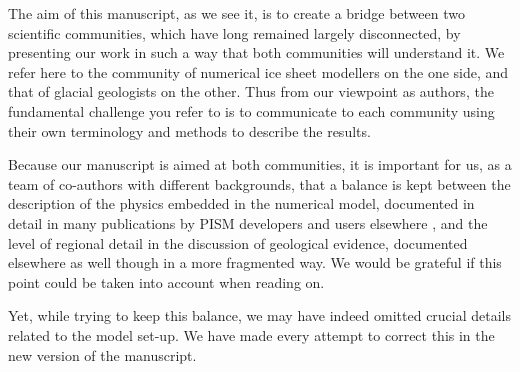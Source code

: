 The aim of this manuscript, as we see it, is to create a bridge between two
scientific communities, which have long remained largely disconnected, by
presenting our work in such a way that both communities will understand it. We
refer here to the community of numerical ice sheet modellers on the one side,
and that of glacial geologists on the other. Thus from our viewpoint as
authors, the fundamental challenge you refer to is to communicate to each
community using their own terminology and methods to describe the results.

Because our manuscript is aimed at both communities, it is important for us, as
a team of co-authors with different backgrounds, that a balance is kept between
the description of the physics embedded in the numerical model, documented in
detail in many publications by PISM developers and users elsewhere
\citep[e.g.,][]{Bueler.Brown.2009, Winkelmann.etal.2011, Martin.etal.2011,
Aschwanden.etal.2013, Seguinot.2014, Bueler.Pelt.2015}, and the level of
regional detail in the discussion of geological evidence, documented elsewhere
as well though in a more fragmented way. We would be grateful if this point
could be taken into account when reading on.

Yet, while trying to keep this balance, we may have indeed omitted crucial
details related to the model set-up. We have made every attempt to correct this
in the new version of the manuscript.


